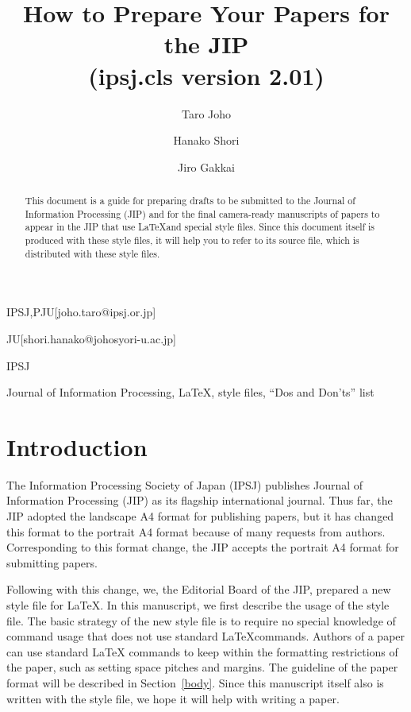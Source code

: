 \documentclass[english,preprint,JIP]{ipsj-lualatex}
\begin{document}
\title{How to Prepare Your Papers for the JIP\\
(ipsj.cls version 2.01)}


\author{Taro Joho}{IPSJ,PJU}[joho.taro@ipsj.or.jp]
\author{Hanako Shori}{JU}[shori.hanako@johosyori-u.ac.jp]
\author{Jiro Gakkai}{IPSJ}


\begin{abstract}
This document is a guide for preparing drafts to be submitted to the
Journal of Information Processing (JIP) and for the final camera-ready
manuscripts of papers to appear in the JIP that use \LaTeX and special
style files.  Since this document itself is produced with these style
files, it will help you to refer to its source file, which is
distributed with these style files.
\end{abstract}

\begin{keyword}
Journal of Information Processing, \LaTeX, style files, ``Dos and
 Don'ts'' list
\end{keyword}

\maketitle

\section{Introduction}

The Information Processing Society of Japan (IPSJ) publishes Journal of
Information Processing (JIP) as its flagship international journal.
Thus far, the JIP adopted the landscape A4 format for publishing papers,
but it has changed this format to the portrait A4 format because of many
requests from authors.  Corresponding to this format change, the JIP
accepts the portrait A4 format for submitting papers.

Following with this change, we, the Editorial Board of the JIP, prepared
a new style file for \LaTeX\@.  In this manuscript, we first describe
the usage of the style file.  The basic strategy of the new style file
is to require no special knowledge of command usage that does not use
standard \LaTeX commands.  Authors of a paper can use standard \LaTeX
commands to keep within the formatting restrictions of the paper, such
as setting space pitches and margins.  The guideline of the paper format
will be described in Section~\ref{body}.  Since this manuscript itself
also is written with the style file, we hope it will help with writing a
paper.
\end{document}
